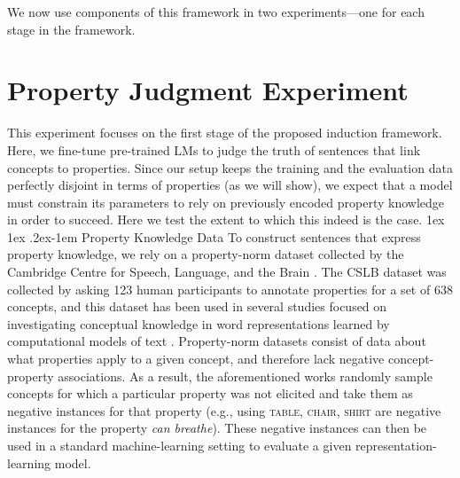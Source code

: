 \documentclass[10pt,letterpaper]{article}
\makeatletter
\renewcommand{\paragraph}{%
  \@startsection{paragraph}{4}%
  {\z@}{1ex \@plus 1ex \@minus .2ex}{-1em}%
  {\normalfont\normalsize\bfseries}%
}
\makeatother
\begin{document}
We now use components of this framework in two experiments---one for each stage in the framework.

\section{Property Judgment Experiment}
This experiment focuses on the first stage of the proposed induction framework. Here, we fine-tune pre-trained LMs to judge the truth of sentences that link concepts to properties. 
Since our setup keeps the training and the evaluation data perfectly disjoint in terms of properties (as we will show), we expect that a model must constrain its parameters to rely on previously encoded property knowledge in order to succeed. Here we test the extent to which this indeed is the case. 
\paragraph{Property Knowledge Data}
To construct sentences that express property knowledge, we rely on a property-norm dataset collected by the Cambridge Centre for Speech, Language, and the Brain \citep[CSLB;][]{devereux2014centre}.
The CSLB dataset was collected by asking 123 human participants to annotate properties for a set of 638 concepts, and this dataset has been used in several
studies focused on investigating conceptual knowledge in word representations learned by computational models of text \citep[e.g., ][]{lucy-gauthier-2017-distributional, da-kasai-2019-cracking, bhatia2020transformer}.
Property-norm datasets consist of data about what properties apply to a given concept, and therefore lack negative concept-property associations. 
As a result, the aforementioned works \citep{lucy-gauthier-2017-distributional, da-kasai-2019-cracking, bhatia2020transformer} randomly sample concepts for which a particular property was not elicited and take them as negative instances for that property (e.g., using \textsc{table, chair, shirt} are negative instances for the property \textit{can breathe}). These negative instances can then be used in a standard machine-learning setting to evaluate a given representation-learning model.
\end{document}
